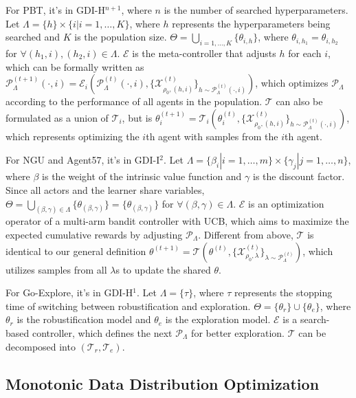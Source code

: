 For PBT, it's in GDI-H$^{n+1}$, where $n$ is the number of  searched hyperparameters.
Let $\Lambda = \{h\} \times \{i| i=1,\dots, K\}$, where $h$ represents the hyperparameters being searched and $K$ is the population size.
$\Theta = \bigcup_{i=1,\dots, K} \{\theta_{i, h}\}$, where $\theta_{i, h_1} = \theta_{i, h_2}$ for $\forall (h_1, i), (h_2, i) \in \Lambda$.
$\mathcal{E}$ is the meta-controller that adjusts $h$ for each $i$, which can be formally written as 
$\mathcal{P}_{\Lambda}^{(t+1)}(\cdot, i)
= \mathcal{E}_{i}(\mathcal{P}_{\Lambda}^{(t)}(\cdot, i), \{\mathcal{X}^{(t)}_{\rho_0, (h, i)}\}_{h \sim \mathcal{P}^{(t)}_{\Lambda}(\cdot, i)} )$,
which optimizes $\mathcal{P}_{\Lambda}$ according to the performance of all agents in the population.
$\mathcal{T}$ can also be formulated as a union of $\mathcal{T}_i$, but is 
$\theta^{(t+1)}_i 
= \mathcal{T}_{i}( \theta^{(t)}_i, \{\mathcal{X}^{(t)}_{\rho_0, (h, i)}\}_{h \sim \mathcal{P}^{(t)}_{\Lambda}(\cdot, i)})$,
which represents optimizing the $i$th agent with samples from the $i$th agent.

For NGU and Agent57, it's in GDI-I$^2$. 
Let $\Lambda = \{\beta_i | i=1,\dots,m\} \times \{\gamma_j | j=1,\dots,n\}$, where $\beta$ is the weight of the intrinsic value function and $\gamma$ is the discount factor.
Since all actors and the learner share variables, $\Theta = \bigcup_{(\beta, \gamma) \in \Lambda} \{\theta_{(\beta, \gamma)}\} = \{\theta_{(\beta, \gamma)}\}$ for $\forall (\beta, \gamma) \in \Lambda$.
$\mathcal{E}$ is an optimization operator of a multi-arm bandit controller with UCB, which aims to maximize the expected cumulative rewards by adjusting $\mathcal{P}_{\Lambda}$.
Different from above, $\mathcal{T}$ is identical to our general definition $\theta^{(t+1)} 
= \mathcal{T}( \theta^{(t)}, \{\mathcal{X}^{(t)}_{\rho_0, \lambda}\}_{\lambda \sim \mathcal{P}^{(t)}_{\Lambda}} )$,
which utilizes samples from all $\lambda$s to update the shared $\theta$.


For Go-Explore, it's in GDI-H$^1$. 
Let $\Lambda = \{\tau\}$, where $\tau$ represents the stopping time of switching between robustification and exploration.
$\Theta = \{\theta_r\} \cup \{\theta_e\}$, where $\theta_r$ is the robustification model and $\theta_e$ is the exploration model.
$\mathcal{E}$ is a search-based controller, which defines the next $\mathcal{P}_{\Lambda}$ for better exploration.
$\mathcal{T}$ can be decomposed into $(\mathcal{T}_r, \mathcal{T}_e)$.

\subsection{Monotonic Data Distribution Optimization}
\label{sec: Monotonic Data Distribution Optimization}


